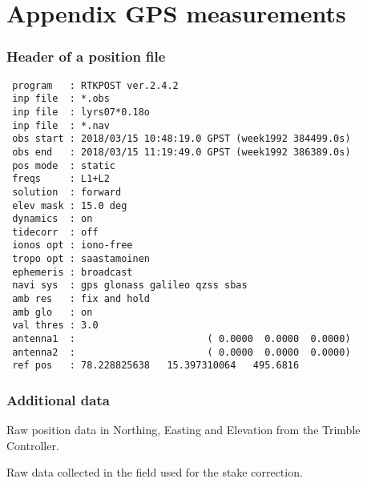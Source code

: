 

\chapter{Appendix GPS measurements}
\label{studentxx:appendix}

\subsection*{Header of a position file}
\begin{verbatim}
 program   : RTKPOST ver.2.4.2
 inp file  : *.obs
 inp file  : lyrs07*0.18o
 inp file  : *.nav
 obs start : 2018/03/15 10:48:19.0 GPST (week1992 384499.0s)
 obs end   : 2018/03/15 11:19:49.0 GPST (week1992 386389.0s)
 pos mode  : static
 freqs     : L1+L2
 solution  : forward
 elev mask : 15.0 deg
 dynamics  : on
 tidecorr  : off
 ionos opt : iono-free
 tropo opt : saastamoinen
 ephemeris : broadcast
 navi sys  : gps glonass galileo qzss sbas
 amb res   : fix and hold
 amb glo   : on
 val thres : 3.0
 antenna1  :                       ( 0.0000  0.0000  0.0000)
 antenna2  :                       ( 0.0000  0.0000  0.0000)
 ref pos   : 78.228825638   15.397310064   495.6816
\end{verbatim}

\subsection*{Additional data}

\begin{table}[h]
	\caption{Raw position data in Northing, Easting and Elevation from the Trimble Controller.}
	\centering
		
		\label{GPS:tab:fb_pos_tab}	
\end{table}

\begin{table}[h]
	\caption{Raw data collected in the field used for the stake correction.}
	\centering
	\begin{turn}{90}
		\scriptsize
		
		\label{GPS:tab:fb_other_tab}
	\end{turn}
\end{table}

